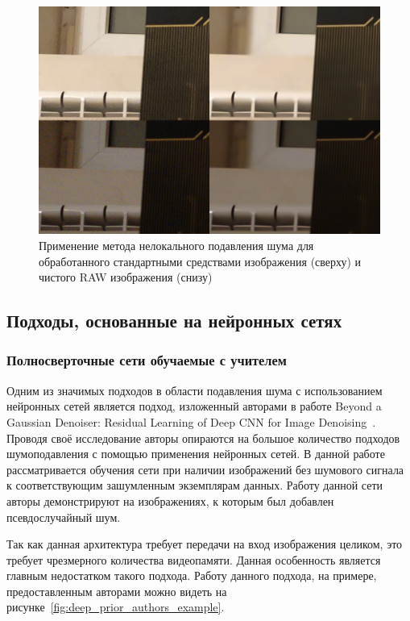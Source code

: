 \documentclass[14pt]{mmcs_article}
\begin{document}
\begin{figure}[H]
	\centering
	\includegraphics[width=\textwidth]{img/nlmdenoising_comparison}
	\caption{Применение метода нелокального подавления шума для обработанного стандартными средствами изображения (сверху) и чистого RAW изображения (снизу)}
	\label{fig:nlmdenoising_comparison}
\end{figure}

\subsection{Подходы, основанные на нейронных  сетях}

\subsubsection{Полносверточные сети обучаемые с учителем}

Одним из значимых подходов в области подавления шума с использованием нейронных сетей является подход, изложенный авторами в работе Beyond a Gaussian Denoiser: Residual Learning of Deep CNN for Image Denoising~\autocite{DeepPrior}. Проводя своё исследование авторы опираются на большое количество подходов шумоподавления с помощью применения нейронных сетей. В данной работе рассматривается обучения сети при наличии изображений без шумового сигнала к соответствующим зашумленным экземплярам данных. Работу данной сети авторы демонстрируют на изображениях, к которым был добавлен псевдослучайный шум.

Так как данная архитектура требует передачи на вход изображения целиком, это требует чрезмерного количества видеопамяти. Данная особенность является главным недостатком такого подхода. Работу данного подхода, на примере, предоставленным авторами можно видеть на рисунке~\ref{fig:deep_prior_authors_example}.
\end{document}
